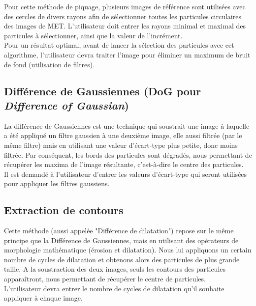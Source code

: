 \noindent
Pour cette méthode de piquage, plusieurs images de référence sont utilisées avec des cercles de divers rayons afin de sélectionner toutes les particules circulaires des images de MET. L'utilisateur doit entrer les rayons minimal et maximal des particules à sélectionner, ainsi que la valeur de l'incrément. \\
Pour un résultat optimal, avant de lancer la sélection des particules avec cet algorithme, l'utilisateur devra traiter l'image pour éliminer un maximum de bruit de fond (utilisation de filtres).

\subsection{Différence de Gaussiennes (DoG pour \textit{Difference of Gaussian})}

La différence de Gaussiennes est une technique qui soustrait une image à laquelle a été appliqué un filtre gaussien à une deuxième image, elle aussi filtrée (par le m\^eme filtre) mais en utilisant une valeur d'écart-type plus petite, donc moins filtrée. Par conséquent, les bords des particules sont dégradés, nous permettant de récupérer les maxima de l'image résultante, c'est-à-dire le centre des particules.\\
\noindent
Il est demandé à l'utilisateur d'entrer les valeurs d'écart-type qui seront utilisées pour appliquer les filtres gaussiens.

\subsection{Extraction de contours}

Cette méthode (aussi appelée "Différence de dilatation") repose sur le même principe que la Différence de Gaussiennes, mais en utilisant des opérateurs de morphologie mathématique (érosion et dilatation). Nous lui appliquons un certain nombre de cycles de dilatation et obtenons alors des particules de plus grande taille. A la soustraction des deux images, seuls les contours des particules apparaîtront, nous permettant de récupérer le centre de particules.\\
L'utilisateur devra entrer le nombre de cycles de dilatation qu'il souhaite appliquer à chaque image.

